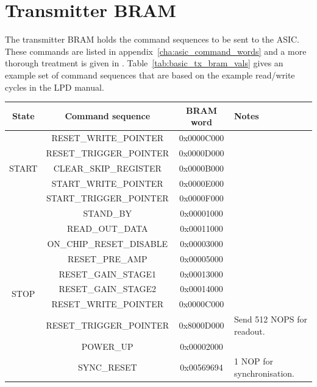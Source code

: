     \section{Transmitter BRAM} %
    \label{sub:basic_transmitter_bram}
    The transmitter BRAM holds the command sequences to be sent to the ASIC. These commands are listed in appendix~\ref{cha:asic_command_words} and a more thorough treatment is given in \cite{lpd_manual}. Table~\ref{tab:basic_tx_bram_vals} gives an example set of command sequences that are based on the example read/write cycles in the LPD manual\cite{lpd_manual}.
    \begin{table}
        \begin{center}
        \begin{tabular}{c|c|c|l}
            State & Command sequence & BRAM word & Notes \\
            \hline
            \multirow{5}{*}{START}  
              & RESET\_WRITE\_POINTER   & 0x0000C000 & \\
              & RESET\_TRIGGER\_POINTER & 0x0000D000 & \\
              & CLEAR\_SKIP\_REGISTER   & 0x0000B000 & \\
              & START\_WRITE\_POINTER   & 0x0000E000 & \\
              & START\_TRIGGER\_POINTER & 0x0000F000 & \\
            \hline
            \multirow{12}{*}{STOP} 
              & STAND\_BY                & 0x00001000 & \\
              & READ\_OUT\_DATA          & 0x00011000 & \\
              & ON\_CHIP\_RESET\_DISABLE & 0x00003000 & \\
              & RESET\_PRE\_AMP          & 0x00005000 & \\
              & RESET\_GAIN\_STAGE1      & 0x00013000 & \\
              & RESET\_GAIN\_STAGE2      & 0x00014000 & \\
              & RESET\_WRITE\_POINTER    & 0x0000C000 & \\
              & RESET\_TRIGGER\_POINTER  & 0x8000D000 & Send 512 NOPS for readout. \\
              & POWER\_UP                & 0x00002000 & \\
              & SYNC\_RESET              & 0x00569694 & 1 NOP for synchronisation. \\

\end{tabular}
\end{center}
\end{table}
